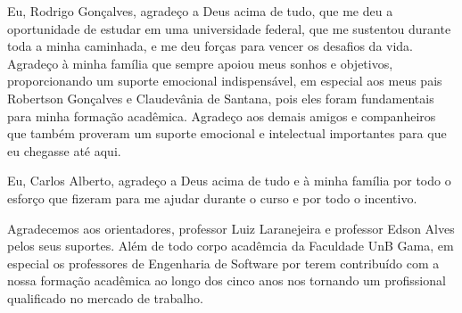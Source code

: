 \begin{agradecimentos}
Eu, Rodrigo Gonçalves, agradeço a Deus acima de tudo, que me deu a oportunidade de estudar em uma universidade federal, que me sustentou durante toda a minha caminhada, e me deu forças para vencer os desafios da vida. Agradeço à minha família que sempre apoiou meus sonhos e objetivos, proporcionando um suporte emocional indispensável, em especial aos meus pais Robertson Gonçalves e Claudevânia de Santana, pois eles foram fundamentais para minha formação acadêmica. Agradeço aos demais amigos e companheiros que também proveram um suporte emocional e intelectual importantes para que eu chegasse até aqui.

Eu, Carlos Alberto, agradeço a Deus acima de tudo e à minha família por todo o esforço que fizeram para me ajudar durante o curso e por todo o incentivo.

Agradecemos aos orientadores, professor Luiz Laranejeira e professor Edson Alves pelos seus suportes. Além de todo corpo acadêmcia da Faculdade UnB Gama, em especial os professores de Engenharia de Software por terem contribuído com a nossa formação acadêmica ao longo dos cinco anos nos tornando um profissional qualificado no mercado de trabalho.
\end{agradecimentos}
